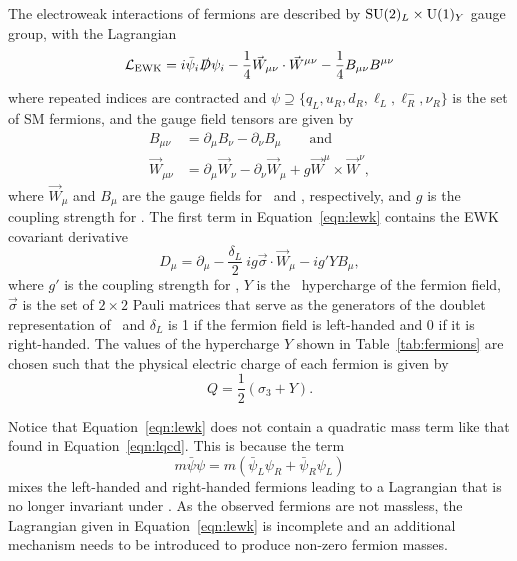The electroweak interactions of fermions are described by $\text{SU}(2)_L \times \text{U}(1)_Y$ gauge group, with the Lagrangian
\begin{equation}
  \label{eqn:lewk}
  \mathcal{L}_{\text{EWK}} = i \bar \psi_i \slashed D \psi_i - \frac{1}{4} \vec W_{\mu\nu} \cdot \vec W^{\mu\nu} - \frac{1}{4} B_{\mu\nu} B^{\mu\nu}
\end{equation}
where repeated indices are contracted and $\psi \supseteq \{q_L, u_R, d_R, \ell_L, \ell^{-}_R, \nu_R\}$ is the set of SM fermions, and the gauge field tensors are given by
\begin{align}
  B_{\mu\nu} & = \partial_\mu B_\nu - \partial_\nu B_\mu \qquad \text{and} \\
  \vec W_{\mu\nu} & = \partial_\mu \vec W_\nu - \partial_\nu \vec W_\mu + g \vec W^\mu \times \vec W^\nu ,
\end{align}
where $\vec W_\mu$ and $B_\mu$ are the gauge fields for \sutwo\ and \uone, respectively, and $g$ is the coupling strength for \sutwo.
The first term in Equation~\ref{eqn:lewk} contains the EWK covariant derivative
\begin{equation}
  D_{\mu} = \partial_\mu - \frac{\delta_L}{2} \: i g \vec \sigma \cdot \vec W_\mu - i g' Y B_\mu,
\end{equation}
where $g'$ is the coupling strength for \uone,
$Y$ is the \uone\ hypercharge of the fermion field,
$\vec \sigma$ is the set of $2\times2$ Pauli matrices that serve as the generators of the doublet representation of \sutwo\,
and $\delta_L$ is 1 if the fermion field is left-handed and 0 if it is right-handed.
The values of the hypercharge $Y$ shown in Table~\ref{tab:fermions} are chosen such that the physical electric charge of each fermion is given by
\begin{equation}
  Q = \frac{1}{2} \left( \sigma_3 + Y \right).
\end{equation}

Notice that Equation~\ref{eqn:lewk} does not contain a quadratic mass term like that found in Equation~\ref{eqn:lqcd}.
This is because the term
\begin{equation}
  m \bar \psi \psi = m \left( \bar \psi_L \psi_R + \bar \psi_R \psi_L \right)
\end{equation}
mixes the left-handed and right-handed fermions leading to a Lagrangian that is no longer invariant under \sutwo.
As the observed fermions are not massless, the Lagrangian given in Equation~\ref{eqn:lewk} is incomplete and an additional mechanism needs to be introduced to produce non-zero fermion masses.


